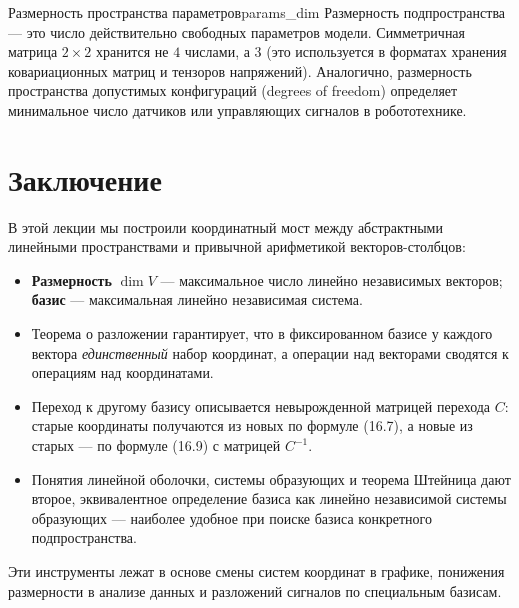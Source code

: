 \documentclass[12pt,a4paper]{article}
\begin{document}
\begin{remarkIT}{Размерность пространства параметров}{params_dim}
  Размерность подпространства --- это число действительно свободных
  параметров модели. Симметричная матрица $2\times 2$ хранится не
  $4$ числами, а $3$ (это используется в форматах хранения ковариационных
  матриц и тензоров напряжений). Аналогично, размерность пространства
  допустимых конфигураций (degrees of freedom) определяет минимальное
  число датчиков или управляющих сигналов в робототехнике.
\end{remarkIT}

\section*{Заключение}

В этой лекции мы построили координатный мост между абстрактными
линейными пространствами и привычной арифметикой векторов-столбцов:
\begin{itemize}
  \item \textbf{Размерность} $\dim V$ --- максимальное число линейно
    независимых векторов; \textbf{базис} --- максимальная линейно
    независимая система.
  \item Теорема о разложении гарантирует, что в фиксированном базисе у
    каждого вектора \emph{единственный} набор координат, а операции над
    векторами сводятся к операциям над координатами.
  \item Переход к другому базису описывается невырожденной матрицей
    перехода $C$: старые координаты получаются из новых по формуле
    (16.7), а новые из старых --- по формуле (16.9) с матрицей
    $C^{-1}$.
  \item Понятия линейной оболочки, системы образующих и теорема
    Штейница дают второе, эквивалентное определение базиса как линейно
    независимой системы образующих --- наиболее удобное при поиске
    базиса конкретного подпространства.
\end{itemize}
Эти инструменты лежат в основе смены систем координат в графике,
понижения размерности в анализе данных и разложений сигналов по
специальным базисам.
\end{document}
